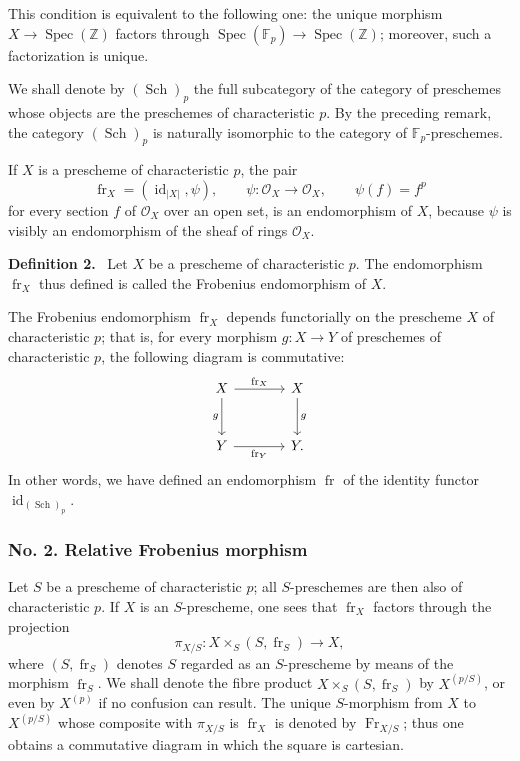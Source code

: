 \documentclass[11pt]{article}
\newenvironment{statement}[1]{\par\medskip\noindent\textbf{#1.}\ }{\par\medskip}
\DeclareMathOperator{\Spec}{Spec}
\providecommand{\OO}{\mathcal{O}}
\providecommand{\id}{\operatorname{id}}
\providecommand{\id}{\operatorname{id}}
\providecommand{\id}{\operatorname{id}}
\providecommand{\id}{\operatorname{id}}
\providecommand{\Spec}{\operatorname{Spec}}
\providecommand{\Spec}{\operatorname{Spec}}
\providecommand{\id}{\operatorname{id}}
\providecommand{\Spec}{\operatorname{Spec}}
\providecommand{\fr}{\operatorname{fr}}
\providecommand{\Fr}{\operatorname{Fr}}
\providecommand{\Sch}{\operatorname{Sch}}
\providecommand{\bF}{\mathbb F}
\providecommand{\bbZ}{\mathbb Z}
\providecommand{\Fr}{\operatorname{Fr}}
\providecommand{\fr}{\operatorname{fr}}
\providecommand{\Sch}{\operatorname{Sch}}
\providecommand{\Spec}{\operatorname{Spec}}
\providecommand{\id}{\operatorname{id}}
\begin{document}
This condition is equivalent to the following one: the unique morphism $X\to\Spec(\bbZ)$ factors through $\Spec(\bF_p)\to\Spec(\bbZ)$; moreover, such a factorization is unique.

We shall denote by $(\Sch)_p$ the full subcategory of the category of preschemes whose objects are the preschemes of characteristic $p$. By the preceding remark, the category $(\Sch)_p$ is naturally isomorphic to the category of $\bF_p$-preschemes.

If $X$ is a prescheme of characteristic $p$, the pair
\[
\fr_X=(\id_{|X|},\psi),
\qquad \psi:\OO_X\longrightarrow\OO_X,
\qquad \psi(f)=f^p
\]
for every section $f$ of $\OO_X$ over an open set, is an endomorphism of $X$, because $\psi$ is visibly an endomorphism of the sheaf of rings $\OO_X$.

\begin{statement}{Definition 2}
Let $X$ be a prescheme of characteristic $p$. The endomorphism $\fr_X$ thus defined is called the Frobenius endomorphism of $X$.
\end{statement}

The Frobenius endomorphism $\fr_X$ depends functorially on the prescheme $X$ of characteristic $p$; that is, for every morphism $g:X\to Y$ of preschemes of characteristic $p$, the following diagram is commutative:
\[
\begin{tikzcd}[column sep=large,row sep=large]
X \arrow[r,"\fr_X"] \arrow[d,"g"'] & X \arrow[d,"g"]\\
Y \arrow[r,"\fr_Y"'] & Y.
\end{tikzcd}
\]
In other words, we have defined an endomorphism $\fr$ of the identity functor $\id_{(\Sch)_p}$.

\subsubsection*{No. 2. Relative Frobenius morphism}

Let $S$ be a prescheme of characteristic $p$; all $S$-preschemes are then also of characteristic $p$. If $X$ is an $S$-prescheme, one sees that $\fr_X$ factors through the projection
\[
\pi_{X/S}:X\times_S(S,\fr_S)\longrightarrow X,
\]
where $(S,\fr_S)$ denotes $S$ regarded as an $S$-prescheme by means of the morphism $\fr_S$. We shall denote the fibre product $X\times_S(S,\fr_S)$ by $X^{(p/S)}$, or even by $X^{(p)}$ if no confusion can result. The unique $S$-morphism from $X$ to $X^{(p/S)}$ whose composite with $\pi_{X/S}$ is $\fr_X$ is denoted by $\Fr_{X/S}$; thus one obtains a commutative diagram in which the square is cartesian.
\end{document}
